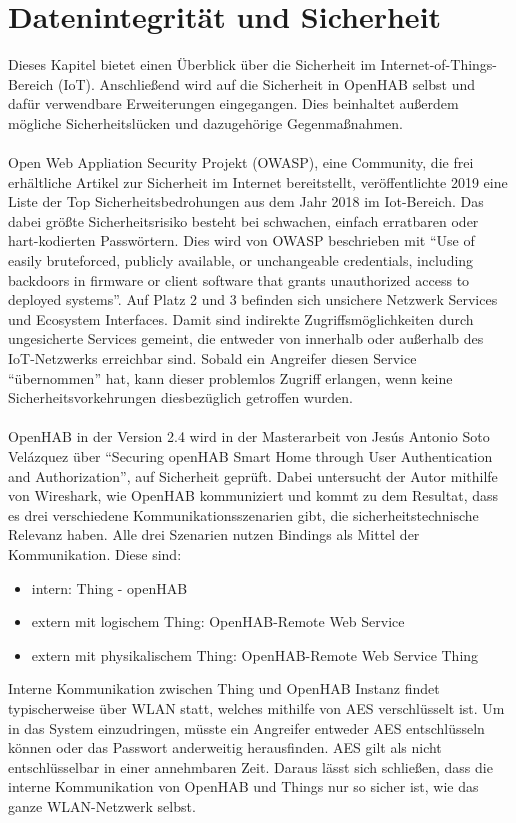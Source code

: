 \section{Datenintegrität und Sicherheit}

Dieses Kapitel bietet einen Überblick über die Sicherheit im Internet-of-Things-Bereich (IoT).  Anschließend wird auf die Sicherheit in OpenHAB selbst und dafür verwendbare Erweiterungen eingegangen. Dies beinhaltet außerdem mögliche Sicherheitslücken und dazugehörige Gegenmaßnahmen.\\
\\
Open Web Appliation Security Projekt (OWASP), eine Community, die frei erhältliche Artikel zur Sicherheit im Internet bereitstellt, veröffentlichte 2019 eine Liste der Top Sicherheitsbedrohungen aus dem Jahr 2018 im Iot-Bereich.\cite{OWASP01:IOT} Das dabei größte Sicherheitsrisiko besteht bei schwachen, einfach erratbaren oder hart-kodierten Passwörtern. Dies wird von OWASP beschrieben mit "`Use of easily bruteforced, publicly available, or unchangeable credentials, including backdoors in firmware or client software that grants unauthorized access to deployed systems"'.\cite{OWASP01:IOT} Auf Platz 2 und 3 befinden sich unsichere Netzwerk Services und Ecosystem Interfaces. Damit sind indirekte Zugriffsmöglichkeiten durch ungesicherte Services gemeint, die entweder von innerhalb oder außerhalb des IoT-Netzwerks erreichbar sind. Sobald ein Angreifer diesen Service "`übernommen"' hat, kann dieser problemlos Zugriff erlangen, wenn keine Sicherheitsvorkehrungen diesbezüglich getroffen wurden.\\
\\
OpenHAB in der Version 2.4 wird in der Masterarbeit von Jesús Antonio Soto Velázquez über "`Securing openHAB Smart Home through User Authentication and Authorization"', auf Sicherheit geprüft.\cite{MA01:OPH} Dabei untersucht der Autor mithilfe von Wireshark, wie OpenHAB kommuniziert und kommt zu dem Resultat, dass es drei verschiedene Kommunikationsszenarien gibt, die sicherheitstechnische Relevanz haben. Alle drei Szenarien nutzen Bindings als Mittel der Kommunikation. Diese sind:
\begin{itemize}
	\item intern: Thing - openHAB
	\item extern mit logischem Thing: OpenHAB-Remote Web Service
	\item extern mit physikalischem Thing: OpenHAB-Remote Web Service Thing
\end{itemize}	
Interne Kommunikation zwischen Thing und OpenHAB Instanz findet typischerweise über WLAN statt, welches mithilfe von AES verschlüsselt ist. Um in das System einzudringen, müsste ein Angreifer entweder AES entschlüsseln können oder das Passwort anderweitig herausfinden. AES gilt als nicht entschlüsselbar in einer annehmbaren Zeit. Daraus lässt sich schließen, dass die interne Kommunikation von OpenHAB und Things nur so sicher ist, wie das ganze WLAN-Netzwerk selbst.\\
